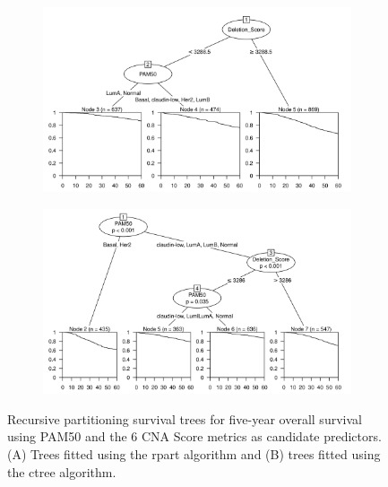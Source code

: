 \begin{figure}[!htb]
\centering

\vspace{0.5cm}

\begin{subfigure}{\textwidth}
\subcaption{}
\includegraphics[width=1\textwidth]{../figures/Appendices/Appendix_B/PartyKit_Survival_Score_FiveYearOS_PAM50.png}
\end{subfigure}

\vspace{2cm}

\begin{subfigure}{\textwidth}
\subcaption{}
\includegraphics[width=1\textwidth]{../figures/Appendices/Appendix_B/Ctree_Survival_Score_FiveYearOS_PAM50.png}
\end{subfigure}

\vspace{0.5cm}

\caption[Recursive partitioning survival trees for five-year overall survival using PAM50 and the 6 CNA Score metrics as candidate predictors.]{Recursive partitioning survival trees for five-year overall survival using PAM50 and the 6 CNA Score metrics as candidate predictors. (A) Trees fitted using the rpart algorithm and (B) trees fitted using the ctree algorithm.}
\end{figure}

